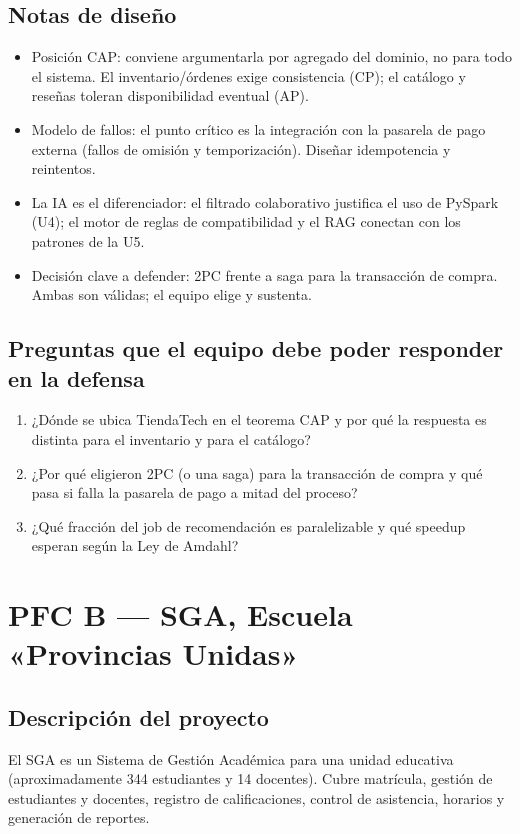\documentclass[11pt]{article}
\begin{document}
\subsection{Notas de diseño}
\begin{itemize}[leftmargin=1.2em,itemsep=2pt]
\item Posición CAP: conviene argumentarla por agregado del dominio, no para todo el sistema. El inventario/órdenes exige consistencia (CP); el catálogo y reseñas toleran disponibilidad eventual (AP).
\item Modelo de fallos: el punto crítico es la integración con la pasarela de pago externa (fallos de omisión y temporización). Diseñar idempotencia y reintentos.
\item La IA es el diferenciador: el filtrado colaborativo justifica el uso de PySpark (U4); el motor de reglas de compatibilidad y el RAG conectan con los patrones de la U5.
\item Decisión clave a defender: 2PC frente a saga para la transacción de compra. Ambas son válidas; el equipo elige y sustenta.
\end{itemize}
\subsection{Preguntas que el equipo debe poder responder en la defensa}
\begin{enumerate}[leftmargin=1.4em,itemsep=2pt]
\item ¿Dónde se ubica TiendaTech en el teorema CAP y por qué la respuesta es distinta para el inventario y para el catálogo?
\item ¿Por qué eligieron 2PC (o una saga) para la transacción de compra y qué pasa si falla la pasarela de pago a mitad del proceso?
\item ¿Qué fracción del job de recomendación es paralelizable y qué speedup esperan según la Ley de Amdahl?
\end{enumerate}
\clearpage
\section{PFC B --- SGA, Escuela «Provincias Unidas»}
\subsection{Descripción del proyecto}
El SGA es un Sistema de Gestión Académica para una unidad educativa (aproximadamente 344 estudiantes y 14 docentes). Cubre matrícula, gestión de estudiantes y docentes, registro de calificaciones, control de asistencia, horarios y generación de reportes.
\end{document}
